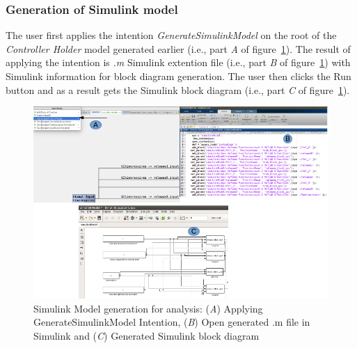 \subsubsection{Generation of Simulink model}
The user first applies the intention \emph{GenerateSimulinkModel} on the root of
the \emph{Controller Holder} model generated earlier (i.e., part \emph{A} of
figure~\ref{fig:SimulinkModelgeneration}). The result of applying the intention is \emph{.m} Simulink extention file
(i.e., part \emph{B} of figure~\ref{fig:SimulinkModelgeneration}) with Simulink
information for block diagram generation. The user then clicks the Run button
and as a result gets the Simulink block diagram (i.e., part \emph{C} of
figure~\ref{fig:SimulinkModelgeneration}). 
\begin{figure}[!h]
\centering
\includegraphics[width=1\textwidth]{./images/SimulinkModelGeneration.png}
\caption{Simulink Model generation for analysis: (\emph{A}) Applying
GenerateSimulinkModel Intention, (\emph{B}) Open generated .m file in Simulink
and (\emph{C}) Generated Simulink block diagram}
\label{fig:SimulinkModelgeneration}
\end{figure}
